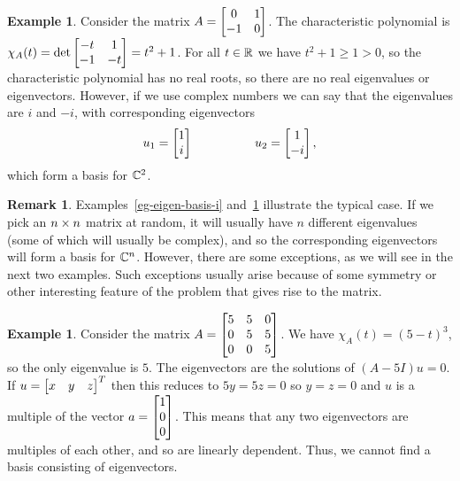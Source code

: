 \documentclass[reqno]{amsart}
\theoremstyle{definition}
\newtheorem{remark}[theorem]{Remark}
\newtheorem{example}[theorem]{Example}
\begin{document}
\begin{example}\label{eg-eigen-basis-ii}
 Consider the matrix $A=\left[\begin{matrix} 0 & 1 \\ -1 & 0 \end{matrix}\right]$.  The
 characteristic polynomial is
 $\chi_A(t)=\det\left[\begin{matrix} -t&1\\-1&-t\end{matrix}\right]=t^2+1$.  For all $t\in{\mathbb{R}}$ we have
 $t^2+1\geq 1>0$, so the characteristic polynomial has no real roots,
 so there are no real eigenvalues or eigenvectors.  However, if we use
 complex numbers we can say that the eigenvalues are $i$ and $-i$,
 with corresponding eigenvectors
 \[ u_1 = \left[\begin{matrix} 1 \\ i \end{matrix}\right] \hspace{5em} u_2 = \left[\begin{matrix} 1 \\ -i\end{matrix}\right], \]
 which form a basis for ${\mathbb{C}}^2$.
\end{example}

\begin{remark}\label{rem-eigen-generic}
 Examples~\ref{eg-eigen-basis-i} and~\ref{eg-eigen-basis-ii}
 illustrate the typical case.  If we pick an $n\times n$ matrix at
 random, it will usually have $n$ different eigenvalues (some of which
 will usually be complex), and so the corresponding eigenvectors will
 form a basis for ${\mathbb{C}}^n$.  However, there are some exceptions, as we
 will see in the next two examples.  Such exceptions usually arise
 because of some symmetry or other interesting feature of the problem
 that gives rise to the matrix.
\end{remark}

\begin{example}\label{eg-eigen-basis-iii}
 Consider the matrix $A=\left[\begin{matrix} 5&5&0 \\ 0&5&5 \\ 0&0&5\end{matrix}\right]$.  We have
 $\chi_A(t)=(5-t)^3$, so the only eigenvalue is $5$.  The eigenvectors
 are the solutions of $(A-5I)u=0$.  If $u=\left[\begin{matrix} x&y&z\end{matrix}\right]^T$ then this
 reduces to $5y=5z=0$ so $y=z=0$ and $u$ is a multiple of the vector
 $a=\left[\begin{matrix} 1\\ 0\\ 0\end{matrix}\right]$.  This means that any two eigenvectors are
 multiples of each other, and so are linearly dependent.  Thus, we
 cannot find a basis consisting of eigenvectors.
\end{example}
\end{document}
